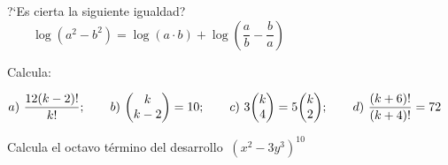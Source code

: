 \vspace{-8mm}
\begin{flushright}
\begin{footnotesize} \textcolor{gris}{}	\end{footnotesize}
\end{flushright}



\begin{mipropuesto}

?`Es cierta la siguiente igualdad? $\qquad \log(a^2-b^2)=\log(a\cdot b)+\log \left( \dfrac a b - \dfrac b a \right)$ 	
\end{mipropuesto}

\vspace{-8mm}
\begin{flushright}
\begin{footnotesize} \textcolor{gris}{}	\end{footnotesize}
\end{flushright}

\begin{mipropuesto}
	
Calcula:

\vspace{2mm} $a) \ \dfrac{12(k-2)!}{k!}; \qquad b)\ \mqty(k\\k-2)=10;\qquad c)\ 3\mqty(k\\4)=5\mqty(k\\2);\qquad d) \ \dfrac{(k+6)!}{(k+4)!}=72$

\end{mipropuesto}


\vspace{-8mm}
\begin{flushright}
\begin{footnotesize} \textcolor{gris}{}	\end{footnotesize}
\end{flushright}


\begin{mipropuesto}
	
	Calcula el octavo término del desarrollo $\ (x^2-3y^3)^{10}$	

\end{mipropuesto}

\vspace{-8mm}
\begin{flushright}
\begin{footnotesize} \textcolor{gris}{}	\end{footnotesize}
\end{flushright}



